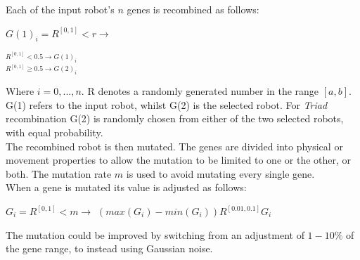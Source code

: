 \documentclass{article}
\begin{document}
Each of the input robot's $n$ genes is recombined as follows:
\begin{center}
\begin{Large}
$G(1)_{i} = R^{[0, 1]} < r \longrightarrow$ 
\begin{LARGE}
$^{R^{[0, 1]} < 0.5\longrightarrow G(1)_{i}} 
_{R^{[0, 1]} \geq 0.5 \longrightarrow G(2)_{i}}$
\end{LARGE}
\end{Large}
\end{center}

Where $i = 0, ..., n$. R denotes a randomly generated number in the range $[a, b]$. G(1) refers to the input robot, whilst G(2) is the selected robot. For \textit{Triad} recombination G(2) is randomly chosen from either of the two selected robots, with equal probability.\\

The recombined robot is then mutated. The genes are divided into physical or movement properties to allow the mutation to be limited to one or the other, or both.
The mutation rate $m$ is used to avoid mutating every single gene.\\
When a gene is mutated its value is adjusted as follows:
\begin{center}
\begin{Large}
$G_{i} = R^{[0, 1]} < m \longrightarrow $
$(max(G_{i}) - min(G_{i})) R^{[0.01, 0.1]}  G_{i}$\\[1\baselineskip]
\end{Large}
\end{center}
The mutation could be improved by switching from an adjustment of $1-10\%$ of the gene range, to instead using Gaussian noise. \\
\end{document}
